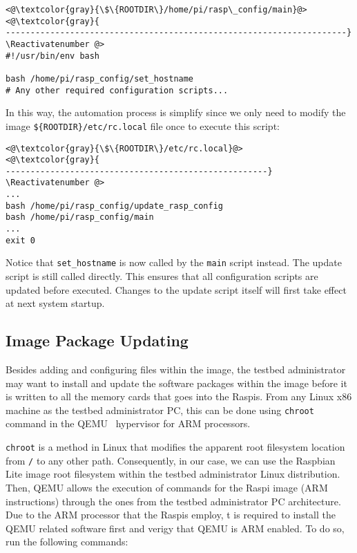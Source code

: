 \Suppressnumber\begin{lstlisting}[]
<@\textcolor{gray}{\$\{ROOTDIR\}/home/pi/rasp\_config/main}@>
<@\textcolor{gray}{
---------------------------------------------------------------------}
\Reactivatenumber @>
#!/usr/bin/env bash

bash /home/pi/rasp_config/set_hostname
# Any other required configuration scripts...
\end{lstlisting}
\FloatBarrier
\vspace{-5mm}

In this way, the automation process is simplify since we only need to modify
the image \texttt{\$\{ROOTDIR\}/etc/rc.local} file once to execute this script:

\Suppressnumber\begin{lstlisting}[]
<@\textcolor{gray}{\$\{ROOTDIR\}/etc/rc.local}@>
<@\textcolor{gray}{
-----------------------------------------------------}
\Reactivatenumber @>
...
bash /home/pi/rasp_config/update_rasp_config
bash /home/pi/rasp_config/main
...
exit 0
\end{lstlisting}
\FloatBarrier
\vspace{-5mm}

Notice that \texttt{set\_hostname} is now called by the \texttt{main}
script instead. The update script is still called directly. This ensures that
all configuration scripts are updated before executed. Changes to the update
script itself will first take effect at next system startup.

\subsection{Image Package Updating}
Besides adding and configuring files within the image, the testbed
administrator may want to install and update the software packages
within the image before it is written to all the memory cards that goes
into the \ac{Raspi}s. From any Linux x86 machine as the testbed administrator
\ac{PC}, this can be done using \texttt{chroot} command in the
QEMU~\cite{QemuUserEmulation} hypervisor for \ac{ARM} processors.

\texttt{chroot} is a method in Linux that modifies the apparent root
filesystem location from \texttt{/} to any other path. Consequently, in
our case, we can use the Raspbian Lite image root filesystem within the
testbed administrator Linux distribution. Then, QEMU allows the execution
of commands for the \ac{Raspi} image (\ac{ARM} instructions) through the ones
from the testbed administrator \ac{PC} architecture. Due to the \ac{ARM}
processor that the \ac{Raspi}s employ, t is required to install the QEMU related software first and verigy that QEMU is \ac{ARM} enabled. To do so,
run the following commands:

